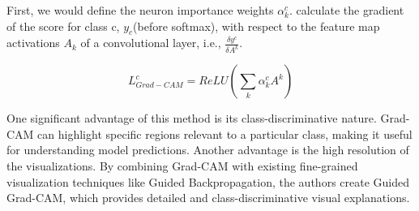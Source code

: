 First, we would define the neuron importance weights $\alpha^c_k$. calculate the gradient of the score for class c, $y_c$(before softmax), with respect to the feature map activations $A_k$ of a convolutional layer, i.e., $\frac{\delta y^c}{\delta A^k}$. 
 
\begin{displaymath}
    L^c_{Grad-CAM} = ReLU(\sum_k\alpha^c_kA^k)
\end{displaymath}

One significant advantage of this method is its class-discriminative nature. Grad-CAM can highlight specific regions relevant to a particular class, making it useful for understanding model predictions. Another advantage is the high resolution of the visualizations. By combining Grad-CAM with existing fine-grained visualization techniques like Guided Backpropagation, the authors create Guided Grad-CAM, which provides detailed and class-discriminative visual explanations.

